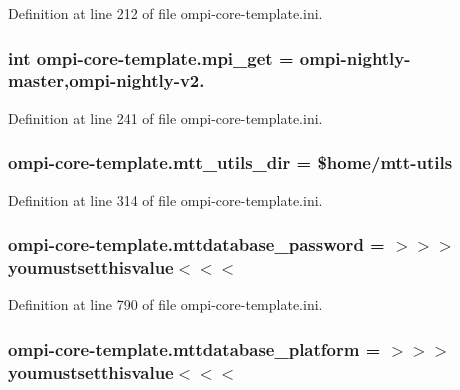 Definition at line 212 of file ompi-\/core-\/template.\-ini.

\hypertarget{namespaceompi-core-template_a2a9de4b31652c233bacb61b1fd294c34}{
\subsubsection[{mpi\-\_\-get}]{\setlength{\rightskip}{0pt plus 5cm}int ompi-\/core-\/template.\-mpi\-\_\-get = ompi-\/nightly-\/master,ompi-\/nightly-\/v2.}}\label{namespaceompi-core-template_a2a9de4b31652c233bacb61b1fd294c34}


Definition at line 241 of file ompi-\/core-\/template.\-ini.

\hypertarget{namespaceompi-core-template_ae338b0b9d4bd23546207d4ce98454696}{
\subsubsection[{mtt\-\_\-utils\-\_\-dir}]{\setlength{\rightskip}{0pt plus 5cm}ompi-\/core-\/template.\-mtt\-\_\-utils\-\_\-dir = \${\bf home}/mtt-\/utils}}\label{namespaceompi-core-template_ae338b0b9d4bd23546207d4ce98454696}


Definition at line 314 of file ompi-\/core-\/template.\-ini.

\hypertarget{namespaceompi-core-template_a1a9c11330769e5a57a4f979e491bac80}{
\subsubsection[{mttdatabase\-\_\-password}]{\setlength{\rightskip}{0pt plus 5cm}ompi-\/core-\/template.\-mttdatabase\-\_\-password = $>$$>$$>$youmustsetthisvalue$<$$<$$<$}}\label{namespaceompi-core-template_a1a9c11330769e5a57a4f979e491bac80}


Definition at line 790 of file ompi-\/core-\/template.\-ini.

\hypertarget{namespaceompi-core-template_aa6b2da2264f2e9f799abe345b01429a5}{
\subsubsection[{mttdatabase\-\_\-platform}]{\setlength{\rightskip}{0pt plus 5cm}ompi-\/core-\/template.\-mttdatabase\-\_\-platform = $>$$>$$>$youmustsetthisvalue$<$$<$$<$}}\label{namespaceompi-core-template_aa6b2da2264f2e9f799abe345b01429a5}


